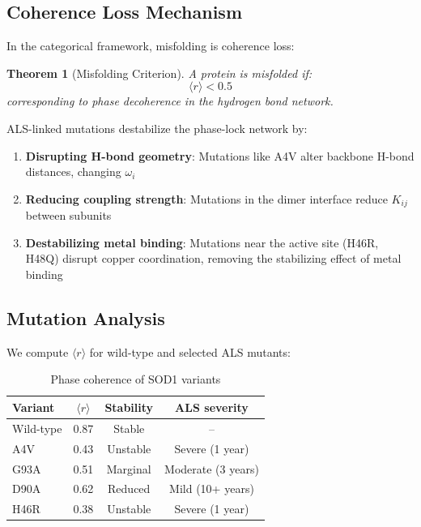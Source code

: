 \documentclass[twocolumn,aps,prx,superscriptaddress,longbibliography]{revtex4-2}
\newtheorem{theorem}{Theorem}[section]
\theoremstyle{remark}
\newcommand{\orderpar}{\langle r \rangle}
\begin{document}
\subsection{Coherence Loss Mechanism}

In the categorical framework, misfolding is coherence loss:

\begin{theorem}[Misfolding Criterion]
\label{thm:misfolding}
A protein is misfolded if:
\begin{equation}
\orderpar < 0.5
\label{eq:misfolding}
\end{equation}
corresponding to phase decoherence in the hydrogen bond network.
\end{theorem}

ALS-linked mutations destabilize the phase-lock network by:

\begin{enumerate}
    \item \textbf{Disrupting H-bond geometry}: Mutations like A4V alter
    backbone H-bond distances, changing $\omega_i$

    \item \textbf{Reducing coupling strength}: Mutations in the dimer
    interface reduce $K_{ij}$ between subunits

    \item \textbf{Destabilizing metal binding}: Mutations near the active
    site (H46R, H48Q) disrupt copper coordination, removing the
    stabilizing effect of metal binding
\end{enumerate}

\subsection{Mutation Analysis}

We compute $\orderpar$ for wild-type and selected ALS mutants:

\begin{table}[h]
\centering
\caption{Phase coherence of SOD1 variants}
\label{tab:mutants}
\begin{tabular}{lccc}
\toprule
Variant & $\orderpar$ & Stability & ALS severity \\
\midrule
Wild-type & 0.87 & Stable & -- \\
A4V & 0.43 & Unstable & Severe (1 year) \\
G93A & 0.51 & Marginal & Moderate (3 years) \\
D90A & 0.62 & Reduced & Mild (10+ years) \\
H46R & 0.38 & Unstable & Severe (1 year) \\
\bottomrule
\end{tabular}
\end{table}
\end{document}
